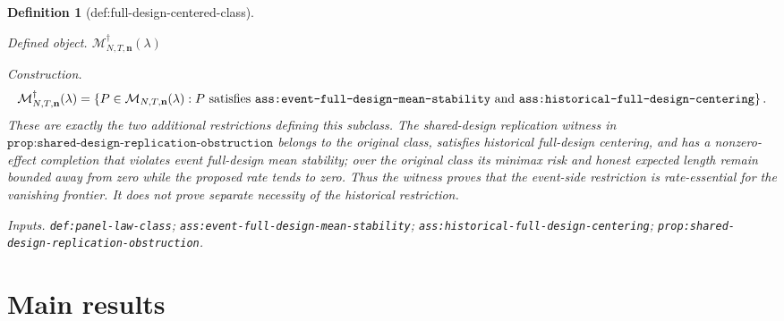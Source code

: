 \documentclass{article}
\newtheorem{definition}{Definition}
\begin{document}
\begin{definition}[def:full-design-centered-class]\label{def:full-design-centered-class}
\par\smallskip\noindent\emph{Defined object.} \(\mathcal M_{N,T,\mathbf n}^{\dagger}(\lambda)\)
\par\smallskip\noindent\emph{Construction.} \[
\mathcal M_{N,T,\mathbf n}^{\dagger}(\lambda)
=\left\{P\in\mathcal M_{N,T,\mathbf n}(\lambda):
P\text{ satisfies \texttt{ass:event-full-design-mean-stability} and }
\texttt{ass:historical-full-design-centering}\right\}.
\]
These are exactly the two additional restrictions defining this subclass.  The shared-design replication witness in \(\texttt{prop:shared-design-replication-obstruction}\) belongs to the original class, satisfies historical full-design centering, and has a nonzero-effect completion that violates event full-design mean stability; over the original class its minimax risk and honest expected length remain bounded away from zero while the proposed rate tends to zero.  Thus the witness proves that the event-side restriction is rate-essential for the vanishing frontier.  It does not prove separate necessity of the historical restriction.
\par\smallskip\noindent\emph{Inputs.} \texttt{def:\allowbreak{}panel-\allowbreak{}law-\allowbreak{}class}; \texttt{ass:\allowbreak{}event-\allowbreak{}full-\allowbreak{}design-\allowbreak{}mean-\allowbreak{}stability}; \texttt{ass:\allowbreak{}historical-\allowbreak{}full-\allowbreak{}design-\allowbreak{}centering}; \texttt{prop:\allowbreak{}shared-\allowbreak{}design-\allowbreak{}replication-\allowbreak{}obstruction}.
\end{definition}

\section{Main results}
\end{document}
